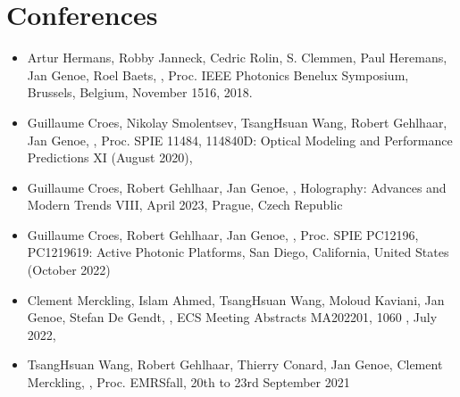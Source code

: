 \documentclass[a4paper,10pt,english,openany,oneside]{jupyterBook}
\begin{document}
\section{Conferences}
\label{\detokenize{Publications2:conferences}}\label{\detokenize{Publications2:conferences-target}}\begin{itemize}
\item {} 
\sphinxAtStartPar
Artur Hermans,
Robby Janneck,
Cedric Rolin,
S. Clemmen,
Paul Heremans,
Jan Genoe,
Roel Baets,
,
Proc. IEEE Photonics Benelux Symposium, Brussels, Belgium, November 15\sphinxhyphen{}16, 2018.

\item {} 
\sphinxAtStartPar
Guillaume Croes,
Nikolay Smolentsev,
Tsang\sphinxhyphen{}Hsuan Wang,
Robert Gehlhaar,
Jan Genoe,
,
Proc. SPIE 11484, 114840D: Optical Modeling and Performance Predictions XI (August 2020),

\item {} 
\sphinxAtStartPar
Guillaume Croes,
Robert Gehlhaar,
Jan Genoe,
,
Holography: Advances and Modern Trends VIII, April 2023, Prague, Czech Republic

\item {} 
\sphinxAtStartPar
Guillaume Croes,
Robert Gehlhaar,
Jan Genoe,
,
Proc. SPIE PC12196, PC1219619: Active Photonic Platforms, San Diego, California, United States (October 2022)

\item {} 
\sphinxAtStartPar
Clement Merckling,
Islam Ahmed,
Tsang\sphinxhyphen{}Hsuan Wang,
Moloud Kaviani,
Jan Genoe,
Stefan De Gendt,
,
ECS Meeting Abstracts MA2022\sphinxhyphen{}01, 1060 , July 2022,

\item {} 
\sphinxAtStartPar
Tsang\sphinxhyphen{}Hsuan Wang,
Robert Gehlhaar,
Thierry Conard,
Jan Genoe,
Clement Merckling,
,
Proc. E\sphinxhyphen{}MRS\sphinxhyphen{}fall, 20th to 23rd September 2021


\end{itemize}
\end{document}
